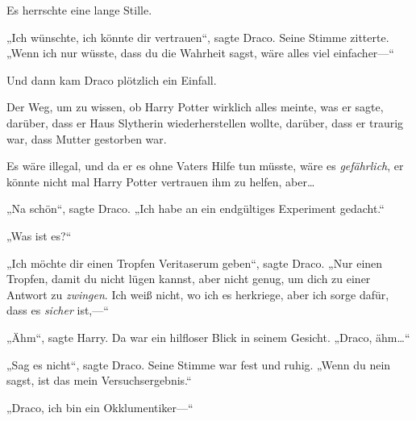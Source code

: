 Es herrschte eine lange Stille.

„Ich wünschte, ich könnte dir vertrauen“, sagte Draco. Seine Stimme zitterte. „Wenn ich nur wüsste, dass du die Wahrheit sagst, wäre alles viel einfacher—“

Und dann kam Draco plötzlich ein Einfall.

Der Weg, um zu wissen, ob Harry Potter wirklich alles meinte, was er sagte, darüber, dass er Haus Slytherin wiederherstellen wollte, darüber, dass er traurig war, dass Mutter gestorben war.

Es wäre illegal, und da er es ohne Vaters Hilfe tun müsste, wäre es \emph{gefährlich}, er könnte nicht mal Harry Potter vertrauen ihm zu helfen, aber…

„Na schön“, sagte Draco. „Ich habe an ein endgültiges Experiment gedacht.“

„Was ist es?“

„Ich möchte dir einen Tropfen Veritaserum geben“, sagte Draco. „Nur einen Tropfen, damit du nicht lügen kannst, aber nicht genug, um dich zu einer Antwort zu \emph{zwingen}. Ich weiß nicht, wo ich es herkriege, aber ich sorge dafür, dass es \emph{sicher} ist,—“

„Ähm“, sagte Harry. Da war ein hilfloser Blick in seinem Gesicht. „Draco, ähm…“

„Sag es nicht“, sagte Draco. Seine Stimme war fest und ruhig. „Wenn du nein sagst, ist das mein Versuchsergebnis.“

„Draco, ich bin ein Okklumentiker—“

